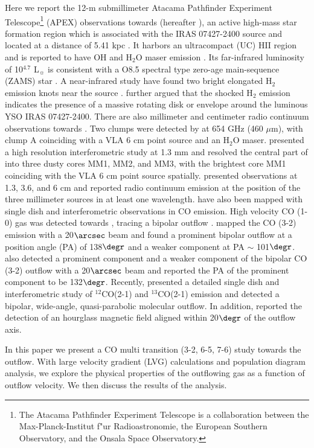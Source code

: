 Here we report the 12-m submillimeter Atacama Pathfinder Experiment Telescope\footnote{    The Atacama Pathfinder Experiment Telescope is a collaboration between the Max-Planck-Institut f"ur Radioastronomie, the European Southern Observatory, and the Onsala Space Observatory.} (APEX) observations towards  (hereafter ), an active high-mass star formation region which is associated with the IRAS 07427-2400 source and located at a distance of 5.41 kpc \citep{2015PASJ...67...69S}. It harbors an ultracompact (UC) HII region and is reported to have OH and H$_2$O maser emission \citep{1993AJ....105.1495H,1997MNRAS.289..203C,1998AJ....116.1897M,1999ApJS..123..487M,2003MNRAS.341..551C}. Its far-infrared luminosity of 10$^{4.7}$ L$_\sun$ is consistent with a O8.5 spectral type zero-age main-sequence (ZAMS) star \citep{1998AJ....116.1897M}. A near-infrared study have found two bright elongated H$_2$ emission knots near the source \citep{2002ApJ...576..313K}. \citet{2003A&A...412..175K} further argued that the shocked H$_2$ emission indicates the presence of a massive rotating disk or envelope around the luminous YSO IRAS 07427-2400. There are also millimeter and centimeter radio continuum observations towards . Two clumps were detected by \citet{2007ApJ...654L..87C} at 654 GHz (460 $\mu$m), with clump A coinciding with a VLA 6 cm point source \citep{1993AJ....105.1495H} and an H$_2$O maser. \citet{2009ApJ...696...66Q} presented a high resolution interferometric study at 1.3 mm and resolved the central part of  into three dusty cores MM1, MM2, and MM3, with the brightest core MM1 coinciding with the VLA 6 cm point source spatially. \citet{2011AJ....142..147T} presented observations at 1.3, 3.6, and 6 cm and reported radio continuum emission at the position of the three millimeter sources in at least one wavelength.  have also been mapped with single dish and interferometric observations in CO emission. High velocity CO (1-0) gas was detected towards  \citep{1991AJ....101.1435M,1996ApJ...457..267S}, tracing a bipolar outflow \citep{1996ApJ...457..267S}. \citet{1997PhDT........21H} mapped the CO (3-2) emission with a 20${\arcsec}$ beam and found a prominent bipolar outflow at a position angle (PA) of 138${\degr}$ and a weaker component at PA $\sim$ 101${\degr}$. \citet{2003A&A...412..175K} also detected a prominent component and a weaker component of the bipolar CO (3-2) outflow with a 20${\arcsec}$ beam and reported the PA of the prominent component to be 132${\degr}$. Recently, \citet{2009ApJ...696...66Q} presented a detailed single dish and interferometric study of $^{12}$CO(2-1) and $^{13}$CO(2-1) emission and detected a bipolar, wide-angle, quasi-parabolic molecular outflow. In addition, \citet{2014ApJ...794L..18Q} reported the detection of an hourglass magnetic field aligned within 20${\degr}$ of the outflow axis.

In this paper we present a CO multi transition (3-2, 6-5, 7-6) study towards the  outflow. With large velocity gradient (LVG) calculations and population diagram analysis, we explore the physical properties of the outflowing gas as a function of outflow velocity. We then discuss the results of the analysis.


